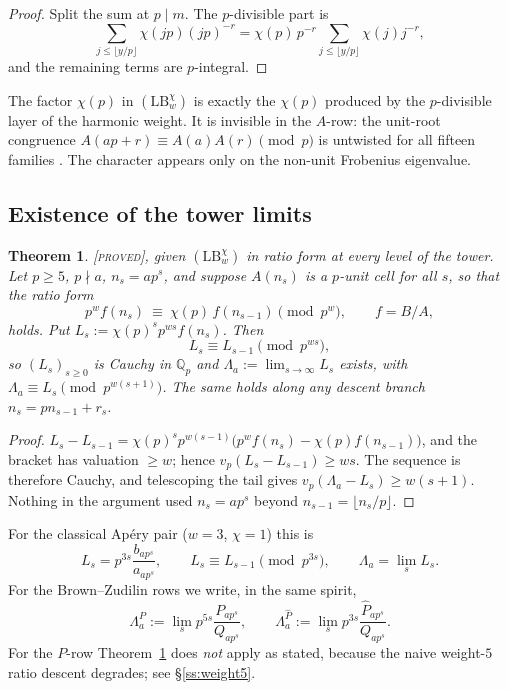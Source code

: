 \documentclass[11pt,reqno]{article}
\newcommand{\Qp}{\mathbb{Q}_p}
\newcommand{\Ph}{\widehat{P}}
\newcommand{\Lah}{\Lambda^{\Ph}}
\newcommand{\Lap}{\Lambda^{P}}
\newcommand{\vp}{v_p}
\newcommand{\floor}[1]{\lfloor #1 \rfloor}
\newcommand{\PROVED}{{\normalfont\textsc{[proved]}}}
\theoremstyle{plain}
\newtheorem{theorem}{Theorem}[section]
\theoremstyle{definition}
\theoremstyle{remark}
\numberwithin{equation}{section}
\begin{document}
\begin{proof}
Split the sum at $p\mid m$.  The $p$-divisible part is
\[
  \sum_{j\le\floor{y/p}}\chi(jp)(jp)^{-r}
  =\chi(p)\,p^{-r}\!\!\sum_{j\le\floor{y/p}}\!\!\chi(j)j^{-r},
\]
and the remaining terms are $p$-integral.
\end{proof}

The factor $\chi(p)$ in $(\mathrm{LB}_w^\chi)$ is exactly the $\chi(p)$ produced
by the $p$-divisible layer of the harmonic weight.  It is invisible in the
$A$-row: the unit-root congruence $A(ap+r)\equiv A(a)A(r)\pmod p$ is untwisted
for all fifteen families \cite{Gessel1982,MalikStraub}.  The character
appears only on the non-unit Frobenius eigenvalue.

\subsection{Existence of the tower limits}\label{ss:exists}

\begin{theorem}\label{thm:exists}
\PROVED, given $(\mathrm{LB}_w^\chi)$ in ratio form at every level of the tower.
Let $p\ge5$, $p\nmid a$, $n_s=ap^s$, and suppose $A(n_s)$ is a $p$-unit cell for
all $s$, so that the ratio form
\[
  p^{w}f(n_s)\ \equiv\ \chi(p)\,f(n_{s-1})\pmod{p^{w}},
  \qquad f=B/A,
\]
holds.  Put $L_s:=\chi(p)^{s}p^{ws}f(n_s)$.  Then
\[
  L_s\equiv L_{s-1}\pmod{p^{ws}},
\]
so $(L_s)_{s\ge0}$ is Cauchy in $\Qp$ and
$\Lambda_a:=\lim_{s\to\infty}L_s$ exists, with
$\Lambda_a\equiv L_s\pmod{p^{w(s+1)}}$.  The same holds along any descent branch
$n_s=pn_{s-1}+r_s$.
\end{theorem}

\begin{proof}
$L_s-L_{s-1}=\chi(p)^{s}p^{w(s-1)}\bigl(p^{w}f(n_s)-\chi(p)f(n_{s-1})\bigr)$,
and the bracket has valuation $\ge w$; hence $\vp(L_s-L_{s-1})\ge ws$.  The
sequence is therefore Cauchy, and telescoping the tail gives
$\vp(\Lambda_a-L_s)\ge w(s+1)$.  Nothing in the argument used $n_s=ap^s$ beyond
$n_{s-1}=\floor{n_s/p}$.
\end{proof}

For the classical Ap\'ery pair ($w=3$, $\chi=1$) this is
\[
  L_s=p^{3s}\frac{b_{ap^s}}{a_{ap^s}},\qquad
  L_s\equiv L_{s-1}\pmod{p^{3s}},\qquad \Lambda_a=\lim_sL_s .
\]
For the Brown--Zudilin rows we write, in the same spirit,
\[
  \Lap_a:=\lim_s p^{5s}\frac{P_{ap^s}}{Q_{ap^s}},
  \qquad
  \Lah_a:=\lim_s p^{3s}\frac{\Ph_{ap^s}}{Q_{ap^s}} .
\]
For the $P$-row Theorem~\ref{thm:exists} does \emph{not} apply as stated,
because the naive weight-$5$ ratio descent degrades; see \S\ref{ss:weight5}.
\end{document}
